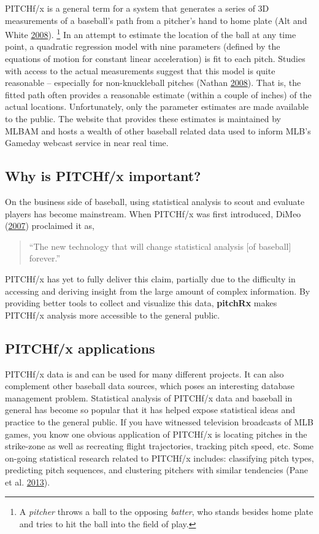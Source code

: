 \documentclass[12pt,]{isuthesis}
\let\rmarkdownfootnote\footnote%
\def\footnote{\protect\rmarkdownfootnote}
\begin{document}
PITCHf/x is a general term for a system that generates a series of 3D
measurements of a baseball's path from a pitcher's hand to home plate
(Alt and White \protect\hyperlink{ref-patent}{2008}).
\footnote{A \textit{pitcher} throws a ball to the opposing \textit{batter}, who
stands besides home plate and tries to hit the ball into the field
of play.
} In an attempt to estimate the location of the ball at any time point,
a quadratic regression model with nine parameters (defined by the
equations of motion for constant linear acceleration) is fit to each
pitch. Studies with access to the actual measurements suggest that this
model is quite reasonable -- especially for non-knuckleball pitches
(Nathan \protect\hyperlink{ref-trajecoryAnalysis}{2008}). That is, the
fitted path often provides a reasonable estimate (within a couple of
inches) of the actual locations. Unfortunately, only the parameter
estimates are made available to the public. The website that provides
these estimates is maintained by MLBAM and hosts a wealth of other
baseball related data used to inform MLB's Gameday webcast service in
near real time.

\subsection{Why is PITCHf/x important?}\label{why-is-pitchfx-important}

On the business side of baseball, using statistical analysis to scout
and evaluate players has become mainstream. When PITCHf/x was first
introduced, DiMeo (\protect\hyperlink{ref-slate}{2007}) proclaimed it
as,

\begin{quote} ``The new technology that will change statistical analysis [of baseball] forever.'' \end{quote}

PITCHf/x has yet to fully deliver this claim, partially due to the
difficulty in accessing and deriving insight from the large amount of
complex information. By providing better tools to collect and visualize
this data, \textbf{pitchRx} makes PITCHf/x analysis more accessible to
the general public.

\subsection{PITCHf/x applications}\label{pitchfx-applications}

PITCHf/x data is and can be used for many different projects. It can
also complement other baseball data sources, which poses an interesting
database management problem. Statistical analysis of PITCHf/x data and
baseball in general has become so popular that it has helped expose
statistical ideas and practice to the general public. If you have
witnessed television broadcasts of MLB games, you know one obvious
application of PITCHf/x is locating pitches in the strike-zone as well
as recreating flight trajectories, tracking pitch speed, etc. Some
on-going statistical research related to PITCHf/x includes: classifying
pitch types, predicting pitch sequences, and clustering pitchers with
similar tendencies (Pane et al. \protect\hyperlink{ref-curve}{2013}).
\end{document}
